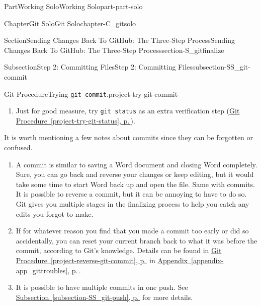 \documentclass[twoside,10pt,]{book}
\newcommand{\xreffont}{\relax}
\newcommand{\mono}[1]{\texttt{#1}}
\newcommand{\consoleinput}[1]{\textbf{#1}}
\begin{document}
\begin{partptx}{Part}{Working Solo}{}{Working Solo}{}{}{part-part-solo}
\begin{chapterptx}{Chapter}{Git Solo}{}{Git Solo}{}{}{chapter-C_gitsolo}
\begin{sectionptx}{Section}{Sending Changes Back To GitHub: The Three-Step Process}{}{Sending Changes Back To GitHub: The Three-Step Process}{}{}{section-S_gitfinalize}
\begin{subsectionptx}{Subsection}{Step 2: Committing Files}{}{Step 2: Committing Files}{}{}{subsection-SS_git-commit}
\begin{project}{Git Procedure}{Trying \mono{git commit}.}{project-try-git-commit}
\begin{enumerate}[font=\bfseries,label=(\alph*),ref=\alph*]
\begin{console}{0}{1}{0}
> (*\consoleinput{git commit -m \textquotedbl{}add birth country\textquotedbl{}}*)
[country 137b0bc] add birth country
 1 file changed, 4 insertions(+)
\end{console}
Note that the message is surrounded by quotation marks. This is required so that Git doesn't think that each word in your message is a separate command. They can be either single or double quotes as long as the two match.%
\par
Also take a look at the output. This tells you the name of your branch, a unique identifier for your commit (so yours will be different than mine), your commit message, how many files were changed, and how many lines were inserted or deleted. This can be useful to verify that the commit worked as you expected.%
\item{}Just for good measure, try \mono{git status} as an extra verification step (\hyperref[project-try-git-status]{Git Procedure~{\xreffont\ref{project-try-git-status}}, p.\,\pageref{project-try-git-status}}).%
\end{enumerate}%
\end{project}%
 It is worth mentioning a few notes about commits since they can be forgotten or confused.%
\begin{enumerate}
\item{}A commit is similar to saving a Word document and closing Word completely. Sure, you can go back and reverse your changes or keep editing, but it would take some time to start Word back up and open the file. Same with commits. It is possible to reverse a commit, but it can be annoying to have to do so. Git gives you multiple stages in the finalizing process to help you catch any edits you forgot to make.%
\item{}If for whatever reason you find that you made a commit too early or did so accidentally, you can reset your current branch back to what it was before the commit, according to Git's knowledge. Details can be found in \hyperref[project-reverse-git-commit]{Git Procedure~{\xreffont\ref{project-reverse-git-commit}}, p.\,\pageref{project-reverse-git-commit}} in \hyperref[appendix-app_gittroubles]{Appendix~{\xreffont\ref{appendix-app_gittroubles}}, p.\,\pageref{appendix-app_gittroubles}}.%
\item{}It is possible to have multiple commits in one push. See \hyperref[subsection-SS_git-push]{Subsection~{\xreffont\ref{subsection-SS_git-push}}, p.\,\pageref{subsection-SS_git-push}} for more details.%

\end{enumerate}
\end{subsectionptx}
\end{sectionptx}
\end{chapterptx}
\end{partptx}
\end{document}
